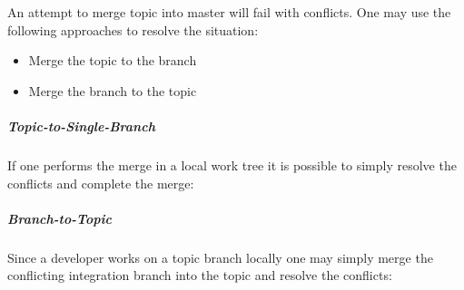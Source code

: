 An attempt to merge topic into master will fail with conflicts. One may use the
following approaches to resolve the situation:
\begin{itemize}
\item Merge the topic to the branch
\item Merge the branch to the topic
\end{itemize}


\subparagraph{Topic-to-Single-Branch}
\label{subpar:TopicToSingleBranch}

If one performs the merge in a local work tree it is possible to simply resolve
the conflicts and complete the merge:

\begin{figure}
\centering
{}
\label{fig:TopicToSingleBranchResolutionApproach}
\end{figure}


\subparagraph{Branch-to-Topic}
\label{subpar:BranchToTopic}

Since a developer works on a topic branch locally one may simply merge the
conflicting integration branch into the topic and resolve the conflicts:

\begin{figure}
\centering
{}
\label{fig:BranchToTopicResolutionApproach}
\end{figure}


